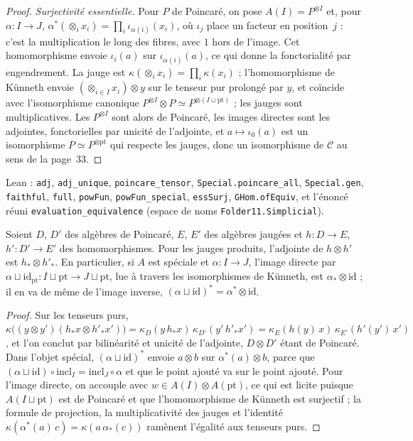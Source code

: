\begin{proof}
\emph{Surjectivité essentielle.} Pour $P$ de Poincaré, on pose $A(I) = P^{\otimes I}$ et, pour $\alpha : I \to J$, $\alpha^*(\otimes_i x_i) = \prod_i \iota_{\alpha(i)}(x_i)$, où $\iota_j$ place un facteur en position~$j$ : c'est la multiplication le long des fibres, avec $1$ hors de l'image. Cet homomorphisme envoie $\iota_i(a)$ sur $\iota_{\alpha(i)}(a)$, ce qui donne la fonctorialité par engendrement. La jauge est $\kappa(\otimes_i x_i) = \prod_i \kappa(x_i)$ ; l'homomorphisme de Künneth envoie $(\otimes_{i \in I} x_i) \otimes y$ sur le tenseur pur prolongé par $y$, et coïncide avec l'isomorphisme canonique $P^{\otimes I} \otimes P \simeq P^{\otimes (I \sqcup \mathrm{pt})}$ ; les jauges sont multiplicatives. Les $P^{\otimes I}$ sont alors de Poincaré, les images directes sont les adjointes, fonctorielles par unicité de l'adjointe, et $a \mapsto \iota_0(a)$ est un isomorphisme $P \simeq P^{\otimes \mathrm{pt}}$ qui respecte les jauges, donc un  isomorphisme de $\mathcal{C}$ au sens de la page~33.
\end{proof}

Lean : \texttt{adj}, \texttt{adj\_unique}, \texttt{poincare\_tensor}, \texttt{Special.\allowbreak{}poincare\_all}, \texttt{Special.\allowbreak{}gen}, \texttt{faithful}, \texttt{full}, \texttt{powFun}, \texttt{powFun\_special}, \texttt{essSurj}, \texttt{GHom.\allowbreak{}ofEquiv}, et l'énoncé réuni \texttt{evaluation\_equivalence} (espace de noms \texttt{Folder11.\allowbreak{}Simplicial}).

\begin{corollaire}
Soient $D$, $D'$ des algèbres de Poincaré, $E$, $E'$ des algèbres jaugées et $h : D \to E$, $h' : D' \to E'$ des homomorphismes. Pour les jauges produits, l'adjointe de $h \otimes h'$ est $h_* \otimes h'_*$. En particulier, si $A$ est spéciale et $\alpha : I \to J$, l'image directe par $\alpha \sqcup \mathrm{id}_{\mathrm{pt}} : I \sqcup \mathrm{pt} \to J \sqcup \mathrm{pt}$, lue à travers les isomorphismes de Künneth, est $\alpha_* \otimes \mathrm{id}$ ; il en va de même de l'image inverse, $(\alpha \sqcup \mathrm{id})^* = \alpha^* \otimes \mathrm{id}$.
\end{corollaire}

\begin{proof}
Sur les tenseurs purs, $\kappa\bigl((y \otimes y')(h_*x \otimes h'_*x')\bigr) = \kappa_D(y\,h_*x)\,\kappa_{D'}(y'\,h'_*x') = \kappa_E(h(y)\,x)\,\kappa_{E'}(h'(y')\,x')$, et l'on conclut par bilinéarité et unicité de l'adjointe, $D \otimes D'$ étant de Poincaré. Dans l'objet spécial, $(\alpha \sqcup \mathrm{id})^*$ envoie $a \otimes b$ sur $\alpha^*(a) \otimes b$, parce que $(\alpha \sqcup \mathrm{id}) \circ \mathrm{incl}_I = \mathrm{incl}_J \circ \alpha$ et que le point ajouté va sur le point ajouté. Pour l'image directe, on accouple avec $w \in A(I) \otimes A(\mathrm{pt})$, ce qui est licite puisque $A(I \sqcup \mathrm{pt})$ est de Poincaré et que l'homomorphisme de Künneth est surjectif ; la formule de projection, la multiplicativité des jauges et l'identité $\kappa(\alpha^*(a)\,c) = \kappa(a\,\alpha_*(c))$ ramènent l'égalité aux tenseurs purs.
\end{proof}

